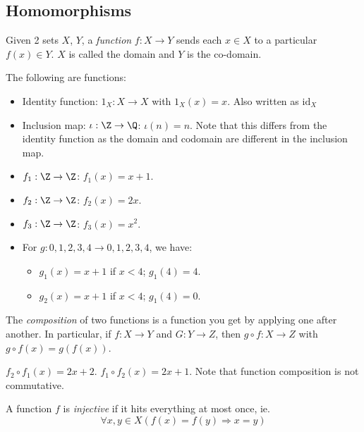 \documentclass[a4paper]{article}
\begin{document}
  \subsection{Homomorphisms}
  \begin{defi}[Function]
    Given 2 sets $X$, $Y$, a \emph{function} $f: X \rightarrow Y$ sends each $x\in X$ to a particular $f(x)\in Y$. $X$ is called the domain and $Y$ is the co-domain.
  \end{defi}
  \begin{eg}
    The following are functions:
    \begin{itemize}
      \item Identity function: $1_X: X \rightarrow X$  with $1_X(x) = x$. Also written as $\mathrm{id}_X$
      \item Inclusion map: $\iota: \Z \rightarrow \Q$: $\iota(n) = n$. Note that this differs from the identity function as the domain and codomain are different in the inclusion map.
      \item $f_1: \Z \rightarrow \Z$: $f_1(x) = x + 1$.
      \item $f_2: \Z \rightarrow \Z$: $f_2(x) = 2x$.
      \item $f_3: \Z \rightarrow \Z$: $f_3(x) = x^2$.
      \item For $g: {0, 1, 2, 3, 4} \rightarrow {0, 1, 2, 3, 4}$, we have:
        \begin{itemize}
          \item $g_1(x) = x + 1$ if $x < 4$; $g_1(4) = 4$.
          \item $g_2(x) = x + 1$ if $x < 4$; $g_1(4) = 0$.
        \end{itemize}
    \end{itemize}
  \end{eg}

  \begin{defi}
    The \emph{composition} of two functions is a function you get by applying one after another. In particular, if $f: X \rightarrow Y$ and $G: Y\rightarrow Z$, then $g\circ f: X \rightarrow Z$ with $g\circ f(x) = g(f(x))$.
  \end{defi}
  \begin{eg}
    $f_2\circ f_1(x) = 2x + 2$. $f_1\circ f_2 (x) = 2x + 1$. Note that function composition is not commutative.
  \end{eg}
  \begin{defi}
    A function $f$ is \emph{injective} if it hits everything at most once, ie.
    \[
      \forall x, y\in X(f(x) = f(y)\Rightarrow x = y)
    \]
  \end{defi}
\end{document}
